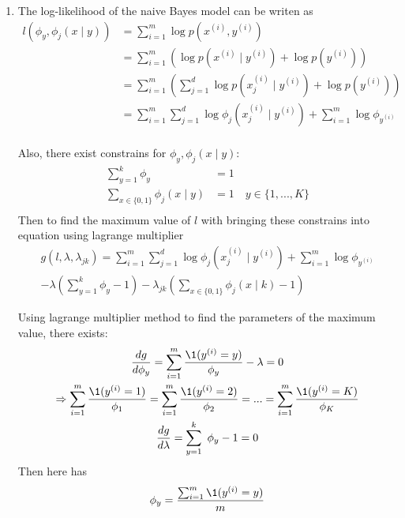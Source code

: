 \documentclass[a4paper]{article}
\begin{document}
\begin{enumerate}
  \setlength{\itemsep}{3\parskip}
\item The log-likelihood of the naive Bayes model can be writen as  
\begin{equation*}
    \begin{aligned}
      l(\phi_y,\phi_j (x \mid y)) 
      &= \sum_{i = 1}^m \log p(x^{(i)}, y^{(i)})\\
      &= \sum_{i = 1}^m (\log p(x^{(i)} \mid y^{(i)}) + \log p(y^{(i)}))\\
      &= \sum_{i = 1}^m (\sum_{j = 1}^d \log p(x^{(i)}_j \mid y^{(i)}) + \log p(y^{(i)}))\\
      &= \sum_{i = 1}^m \sum_{j = 1}^d \log \phi_j (x^{(i)}_j \mid y^{(i)}) + \sum_{i = 1}^m \log \phi_{y^{(i)}}\\
    \end{aligned}
    \label{eq:svm:p}
  \end{equation*}

  Also, there exist constrains for $\phi_y,\phi_j (x \mid y)$:
  \begin{equation}
    \label{constrains}
    \begin{aligned}
      \sum_{y=1}^k \phi_y &= 1\\
      \sum_{x \in \{0,1\}} \phi_j (x \mid y) &= 1 \quad y \in \{1,...,K\}\\
    \end{aligned}
  \end{equation}
Then to find the maximum value of $l$ with bringing these constrains into equation using lagrange multiplier
\begin{equation*}
  \begin{aligned}
    g(l, \lambda, \lambda_{jk}) = \sum_{i = 1}^m \sum_{j = 1}^d \log \phi_j (x^{(i)}_j \mid y^{(i)}) + \sum_{i = 1}^m \log \phi_{y^{(i)}} \\
      - \lambda(\sum_{y=1}^k\phi_y - 1) - \lambda_{jk}(\sum_{x \in \{0,1\}}\phi_j(x \mid k)-1)
  \end{aligned}
\end{equation*}

Using lagrange multiplier method to find the parameters of the maximum value, there exists:
\begin{equation*}
  \begin{gathered}
    \frac{dg}{d \phi_y} = \sum_{i = 1}^m \frac{\1 (y^{(i)}=y)}{\phi_y} - \lambda = 0\\
    \Rightarrow \sum_{i = 1}^m \frac{\1 (y^{(i)}=1)}{\phi_1}=\sum_{i = 1}^m \frac{\1 (y^{(i)}=2)}{\phi_2}=...=\sum_{i = 1}^m \frac{\1 (y^{(i)}=K)}{\phi_K}\\
    \frac{dg}{d \lambda} = \sum_{y=1}^k \phi_y - 1 = 0\\
  \end{gathered}
\end{equation*}
Then here has
\begin{equation*}
  \phi_y = \frac{\sum_{i = 1}^m \1 (y^{(i)}=y)}{m}
\end{equation*}


\end{enumerate}
\end{document}
